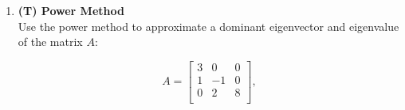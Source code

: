 \documentclass[12pt]{article}
\begin{document}
\begin{enumerate}[label=\bfseries Problem \arabic*:]






 


\item \textbf{(T) Power Method}\\
Use the power method to approximate a dominant eigenvector and eigenvalue of the matrix $A$:

$$A =  \begin{bmatrix}
3 & 0 & 0\\
1 & -1 & 0\\
0& 2 & 8\\
\end{bmatrix},$$


\end{enumerate}
\end{document}
